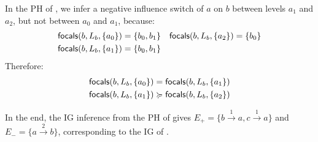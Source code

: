 \begin{example*}
In the PH of , we infer a negative influence switch of $a$ on $b$ between levels $a_1$ and $a_2$, but not between $a_0$ and $a_1$, because:
\begin{align*}
\mathsf{focals}(b, L_b, \{a_0\}) &= \{b_0, b_1\} & \mathsf{focals}(b, L_b, \{a_2\}) &= \{b_0\} \\
\mathsf{focals}(b, L_b, \{a_1\}) &= \{b_0, b_1\}
\end{align*}
Therefore:
\begin{align*}
\mathsf{focals}(b, L_b, \{a_0\}) &= \mathsf{focals}(b, L_b, \{a_1\}) \\
\mathsf{focals}(b, L_b, \{a_1\}) &\succcurlyeq \mathsf{focals}(b, L_b, \{a_2\})
\end{align*}

In the end, the IG inference from the PH of  gives
$E_+ = \{b \xrightarrow{1} a, c \xrightarrow{1} a\}$ and
$E_- = \{a \xrightarrow{2} b\}$, corresponding to the IG of .
\end{example*}
